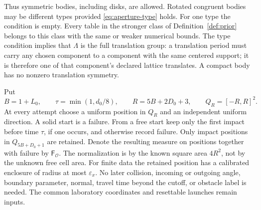 Thus symmetric bodies, including disks, are allowed. Rotated congruent
bodies may be different types provided \eqref{eq:aperture-type} holds.
For one type the condition is empty. Every table in the stronger class
of Definition~\ref{def:prior} belongs to this class with the same or weaker
numerical bounds. The type condition implies that $\Lambda$ is the full
translation group: a translation period must carry any chosen component
to a component with the same centered support; it is therefore one of
that component's declared lattice translates. A compact body has no
nonzero translation symmetry.

Put
\begin{equation}\label{eq:aperture-size}
 B=1+L_0,\qquad \tau=\min(1,d_0/8),\qquad
 R=5B+2D_0+3,\qquad Q_R=[-R,R]^2.
\end{equation}
At every attempt choose a uniform position in $Q_R$ and an independent
uniform direction. A solid start is a failure. From a free start keep
only the first impact before time $\tau$, if one occurs, and otherwise
record failure. Only impact positions in $Q_{5B+D_0+1}$ are retained.
Denote the resulting measure on positions together with failure by
$\mathsf F_{\mathcal O}$. The normalization is by the known square area
$4R^2$, not by the unknown free cell area. For finite data the retained
position has a calibrated enclosure of radius at most $\varepsilon_x$.
No later collision, incoming or outgoing angle, boundary parameter,
normal, travel time beyond the cutoff, or obstacle label is needed.
The common laboratory coordinates and resettable launches remain inputs.


